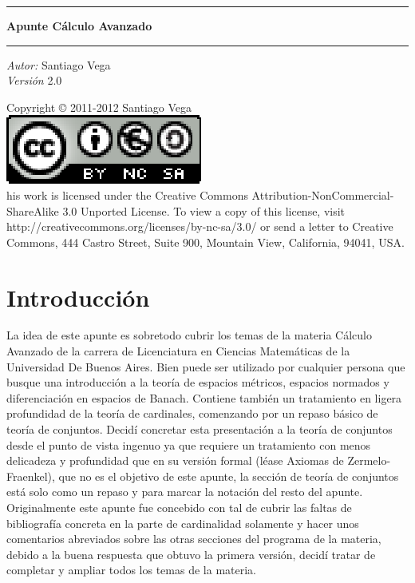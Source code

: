 \documentclass[12pt,a4paper]{book}
\begin{document}
\begin{titlepage}
\begin{center}
\hrule 
{ \huge \bfseries Apunte Cálculo Avanzado}\\[0.4cm]
\hrule 
\Large
\emph{Autor:} Santiago Vega\\[0.4cm]
\emph{Versión} 2.0
\end{center}
\end{titlepage}

\thispagestyle{empty}
\vspace*{465pt}
Copyright \copyright  
2011-2012 Santiago Vega \\
\includegraphics[scale=0.5]{cc.eps}\\
his work is licensed under the Creative 
Commons Attribution-NonCommercial-ShareAlike 3.0 Unported License. To
view a copy of this license, visit\\
 http://creativecommons.org/licenses/by-nc-sa/3.0/ or send a letter to
Creative Commons, 444 Castro Street, Suite 900, Mountain View, California, 94041, USA.

\chapter*{Introducción}
\thispagestyle{empty}
La idea de este apunte es sobretodo cubrir los temas de la materia Cálculo Avanzado de la carrera de Licenciatura en Ciencias Matemáticas de la Universidad De Buenos Aires. Bien puede ser utilizado por cualquier persona que busque una introducción a la teoría de espacios métricos, espacios normados y diferenciación en espacios de Banach. Contiene también un tratamiento en ligera profundidad de la teoría de cardinales, comenzando por un repaso básico de teoría de conjuntos. Decidí concretar esta presentación a la teoría de conjuntos desde el punto de vista ingenuo ya que requiere un tratamiento con menos delicadeza y profundidad que en su versión formal (léase Axiomas de Zermelo-Fraenkel), que no es el objetivo de este apunte, la sección de teoría de conjuntos está solo como un repaso y para marcar la notación del resto del apunte. \\
Originalmente este apunte fue concebido con tal de cubrir las faltas de bibliografía concreta en la parte de cardinalidad solamente y hacer unos comentarios abreviados sobre las otras secciones del programa de la materia, debido a la buena respuesta que obtuvo la primera versión, decidí tratar de completar y ampliar todos los temas de la materia.
\newpage
\thispagestyle{empty}
\setcounter{chapter}{0}
\end{document}
